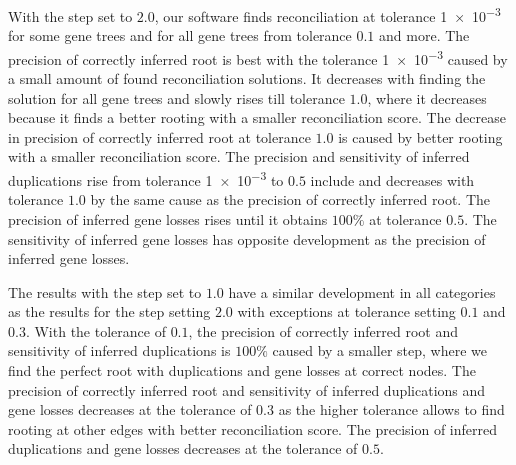 With the step set to $2.0$, our software finds reconciliation at tolerance \num{1e-3} for some gene trees and for all gene trees from tolerance $0.1$ and more. The precision of correctly inferred root is best with the tolerance \num{1e-3} caused by a small amount of found reconciliation solutions. It decreases with finding the solution for all gene trees and slowly rises till tolerance $1.0$, where it decreases because it finds a better rooting with a smaller reconciliation score. The decrease in precision of correctly inferred root at tolerance $1.0$ is caused by better rooting with a smaller reconciliation score. The precision and sensitivity of inferred duplications rise from tolerance \num{1e-3} to $0.5$ include and decreases with tolerance $1.0$ by the same cause as the precision of correctly inferred root. The precision of inferred gene losses rises until it obtains $100\%$ at tolerance $0.5$. The sensitivity of inferred gene losses has opposite development as the precision of inferred gene losses.

The results with the step set to $1.0$ have a similar development in all categories as the results for the step setting $2.0$ with exceptions at tolerance setting $0.1$ and $0.3$. With the tolerance of $0.1$, the precision of correctly inferred root and sensitivity of inferred duplications is $100\%$ caused by a smaller step, where we find the perfect root with duplications and gene losses at correct nodes. The precision of correctly inferred root and sensitivity of inferred duplications and gene losses decreases at the tolerance of $0.3$ as the higher tolerance allows to find rooting at other edges with better reconciliation score.
The precision of inferred duplications and gene losses decreases at the tolerance of $0.5$. 

